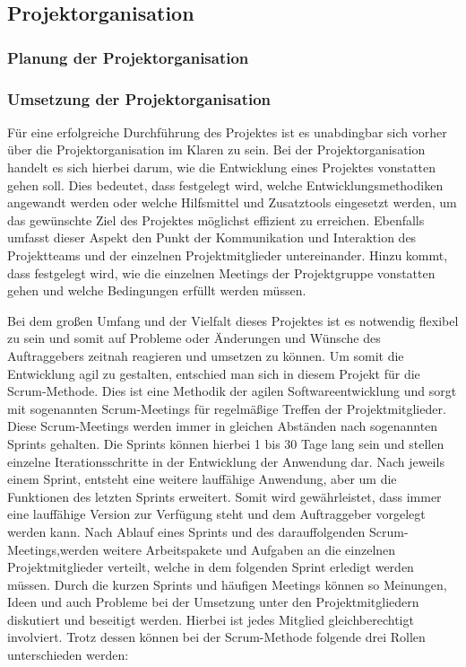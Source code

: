 \subsection{Projektorganisation}
\label{sec:Projektorganisation}

\subsubsection{Planung der Projektorganisation}
\label{sec:PlanungProjektorganisation}

\subsubsection{Umsetzung der Projektorganisation}
\label{sec:UmsetzungProjektorganisation}

Für eine erfolgreiche Durchführung des Projektes ist es unabdingbar sich vorher
über die Projektorganisation im Klaren zu sein. Bei der Projektorganisation
handelt es sich hierbei darum, wie die Entwicklung eines Projektes vonstatten
gehen soll. Dies bedeutet, dass festgelegt wird, welche Entwicklungsmethodiken
angewandt werden oder welche Hilfsmittel und Zusatztools eingesetzt werden, um
das gewünschte Ziel des Projektes möglichst effizient zu erreichen. Ebenfalls
umfasst dieser Aspekt den Punkt der Kommunikation und Interaktion des
Projektteams und der einzelnen Projektmitglieder untereinander. Hinzu kommt,
dass festgelegt wird, wie die einzelnen Meetings der Projektgruppe vonstatten
gehen und welche Bedingungen erfüllt werden müssen.

Bei dem großen Umfang und der Vielfalt dieses Projektes ist es notwendig
flexibel zu sein und somit auf Probleme oder Änderungen und Wünsche des
Auftraggebers zeitnah reagieren und umsetzen zu können. Um somit die
Entwicklung agil zu gestalten, entschied man sich in diesem Projekt für die
Scrum-Methode. Dies ist eine Methodik der agilen Softwareentwicklung und sorgt
mit sogenannten Scrum-Meetings für regelmäßige Treffen der Projektmitglieder.
Diese Scrum-Meetings werden immer in gleichen Abständen nach sogenannten
Sprints gehalten. Die Sprints können hierbei 1 bis 30 Tage lang sein und
stellen einzelne Iterationsschritte in der Entwicklung der Anwendung dar. Nach
jeweils einem Sprint, entsteht eine weitere lauffähige Anwendung, aber um die
Funktionen des letzten Sprints erweitert. Somit wird gewährleistet, dass immer
eine lauffähige Version zur Verfügung steht und dem Auftraggeber vorgelegt
werden kann. Nach Ablauf eines Sprints und des darauffolgenden
Scrum-Meetings,werden weitere Arbeitspakete und Aufgaben an die einzelnen
Projektmitglieder verteilt, welche in dem folgenden Sprint erledigt werden
müssen. Durch die kurzen Sprints und häufigen Meetings können so Meinungen,
Ideen und auch Probleme bei der Umsetzung unter den Projektmitgliedern
diskutiert und beseitigt werden. Hierbei ist jedes Mitglied gleichberechtigt
involviert. Trotz dessen können bei der Scrum-Methode folgende drei Rollen
unterschieden werden:

